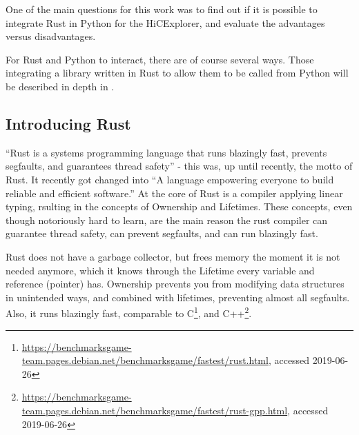 
One of the main questions for this work was to find out if it is possible to
integrate Rust in Python for the HiCExplorer, and evaluate the advantages
versus disadvantages.


For Rust and Python to interact, there are of course several ways. Those
integrating a library written in Rust to allow them to be called from Python
will be described in depth in .





\subsection{Introducing Rust}


``Rust is a systems programming language that runs blazingly fast, prevents
segfaults, and guarantees thread safety'' - this was, up until recently, the
motto of Rust. It recently got changed into ``A language empowering everyone
to build reliable and efficient software.'' At the core of Rust is a compiler
applying linear typing, rsulting in the concepts of Ownership and Lifetimes.
These concepts, even though notoriously hard to learn, are the main reason the
rust compiler can guarantee thread safety, can prevent segfaults, and can run
blazingly fast.




Rust does not have a garbage collector, but frees memory the moment it is not
needed anymore, which it knows through the Lifetime every variable and
reference (pointer) has. Ownership prevents you from modifying data structures
in unintended ways, and combined with lifetimes, preventing almost all
segfaults. Also, it runs blazingly fast, comparable to
C\footnote{\url{https://benchmarksgame-team.pages.debian.net/benchmarksgame/fastest/rust.html},
accessed 2019-06-26}, and
C++\footnote{\url{https://benchmarksgame-team.pages.debian.net/benchmarksgame/fastest/rust-gpp.html},
accessed 2019-06-26}.


